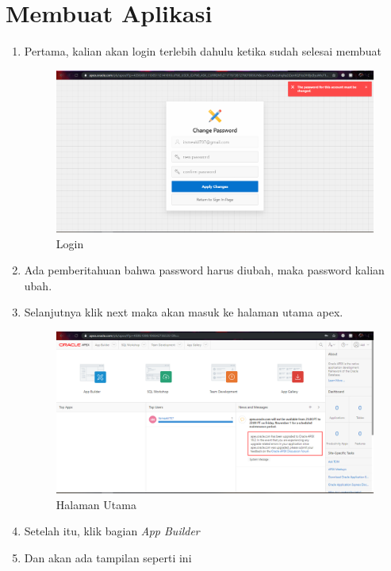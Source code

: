 \documentclass{article}
\begin{document}
\section{Membuat Aplikasi}
\begin{enumerate}
    \item Pertama, kalian akan login terlebih dahulu ketika sudah selesai membuat 
    \begin{figure}[!htbp]
        \centering
        \includegraphics[scale=0.3]{8.PNG}
        \caption{Login}
    \end{figure}
    \item Ada pemberitahuan bahwa password harus diubah, maka password kalian ubah.
    \item Selanjutnya klik next maka akan masuk ke halaman utama apex.
    \begin{figure}[!htbp]
        \centering
        \includegraphics[scale=0.3]{9.PNG}
        \caption{Halaman Utama}
    \end{figure}
\newpage
    \item Setelah itu, klik bagian \textit{App Builder}
    \item Dan akan ada tampilan seperti ini
    \begin{figure}[!htbp]

\end{figure}
\end{enumerate}
\end{document}
